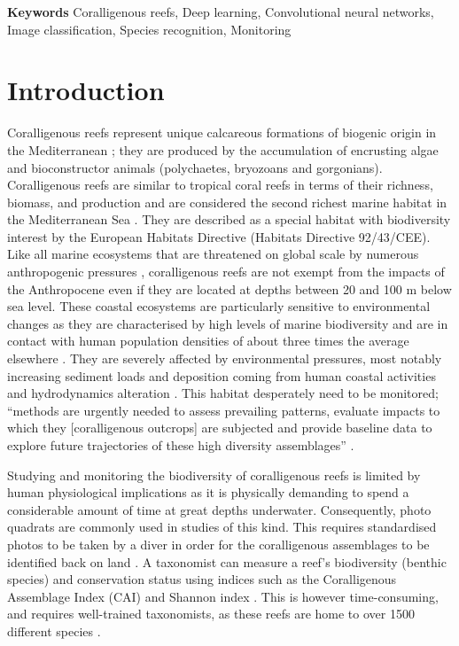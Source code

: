 \noindent\textbf{Keywords}
Coralligenous reefs, Deep learning, Convolutional neural networks, Image classification, Species recognition, Monitoring

\section{Introduction}\label{chapitre1_1}
Coralligenous reefs represent unique calcareous formations of biogenic origin in the Mediterranean \citep{ballesteros_mediterranean_2006}; they are produced by the accumulation of encrusting algae and bioconstructor animals (polychaetes, bryozoans and gorgonians). Coralligenous reefs are similar to tropical coral reefs in terms of their richness, biomass, and production \citep{bianchi_biocostruzione_2001} and are considered the second richest marine habitat in the Mediterranean Sea \citep{boudouresque_marine_2004}. They are described as a special habitat with biodiversity interest by the European Habitats Directive (Habitats Directive 92/43/CEE). Like all marine ecosystems that are threatened on global scale by numerous anthropogenic pressures \citep{halpern_global_2008, hoekstra_confronting_2004}, coralligenous reefs are not exempt from the impacts of the Anthropocene \citep{mcgill_fifteen_2015} even if they are located at depths between 20 and 100 m below sea level. These coastal ecosystems are particularly sensitive to environmental changes as they are characterised by high levels of marine biodiversity \citep{halpern_global_2008} and are in contact with human population densities of about three times the average elsewhere \citep{small_global_2003}. They are severely affected by environmental pressures, most notably increasing sediment loads and deposition coming from human coastal activities and hydrodynamics alteration \citep{airoldi_effects_2003, ballesteros_mediterranean_2006}. This habitat desperately need to be monitored; “methods are urgently needed to assess prevailing patterns, evaluate impacts to which they [coralligenous outcrops] are subjected and provide baseline data to explore future trajectories of these high diversity assemblages” \citep{kipson_rapid_2011}.

Studying and monitoring the biodiversity of coralligenous reefs is limited by human physiological implications as it is physically demanding to spend a considerable amount of time at great depths underwater. Consequently, photo quadrats are commonly used in studies of this kind. This requires standardised photos to be taken by a diver in order for the coralligenous assemblages to be identified back on land \citep{deter_rapid_2012}. A taxonomist can measure a reef’s biodiversity (benthic species) and conservation status using indices such as the Coralligenous Assemblage Index (CAI) \citep{deter_preliminary_2012} and Shannon index \citep{magurran_measuring_2004}. This is however time-consuming, and requires well-trained taxonomists, as these reefs are home to over 1500 different species \citep{ballesteros_mediterranean_2006}. 

